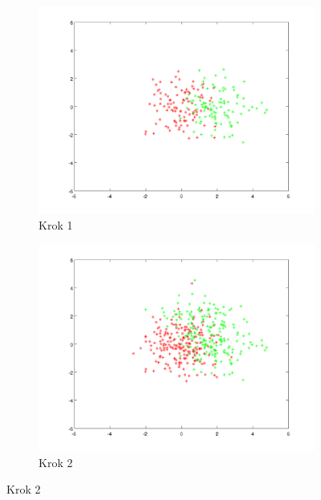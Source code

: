 \documentclass[10pt,a4paper]{article}
\begin{document}
\begin{figure}[h]
  \begin{subfigure}[b]{0.4\textwidth}
    \includegraphics[width=\textwidth]{dataGen_step0.png}
    \caption{Krok 1}
  \end{subfigure}
  \hfill
  \begin{subfigure}[b]{0.4\textwidth}
    \includegraphics[width=\textwidth]{dataGen_step1.png}
    \caption{Krok 2}
  \end{subfigure}


\end{figure}
\end{document}
